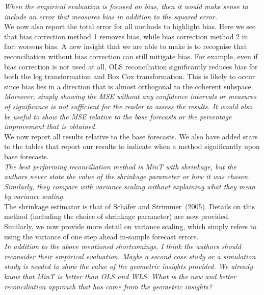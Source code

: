 \documentclass[a4paper,11pt]{article}
\begin{document}
\begin{enumerate}
		\textit{When the empirical evaluation is focused on bias, then it would make sense to include an error that measures bias in addition to the squared error.}\\
		
		We now also report the total error for all methods to highlight bias.  Here we see that bias correction method 1 removes bias, while bias correction method 2 in fact worsens bias.  A new insight that we are able to make is to recognise that reconciliation without bias correction can still mitigate bias.  For example, even if bias correction is not used at all, OLS reconciliation significantly reduces bias for both the log transformation and Box Cox transformation.  This is likely to occur since bias lies in a direction that is almost orthogonal to the coherent subspace.\\
		
		\textit{Moreover, simply showing the MSE without any confidence intervals or measures of significance is not sufficient for the reader to assess the results.  It would also be useful to show the MSE relative to the base forecasts or the percentage improvement that is obtained.} \\
		
		We now report all results relative to the base forecasts. We also have added stars to the tables that report our results to indicate when a method significantly upon base forecasts.\\
	
	    \textit{The best performing reconciliation method is MinT with shrinkage, but the authors never state	the value of the shrinkage parameter or how it was chosen.  Similarly, they compare with variance scaling without explaining what they mean by variance scaling.}\\
	    
	    The shrinkage estimator is that of Sch\"afer and Strimmer~(2005). Details on this method (including the choice of shrinkage parameter) are now provided.  Similarly, we now provide more detail on variance scaling, which simply refers to using the variance of one step ahead in-sample forecast errors.\\
	    
	    \textit{In addition to the above mentioned shortcomings, I think the authors should reconsider their empirical evaluation. Maybe a second case study or a simulation study is needed to show the value of the geometric insights provided. We already know that MinT is better than OLS and WLS. What is the new and better reconciliation approach that has come from the geometric insights?}\\	
		

\end{enumerate}
\end{document}
